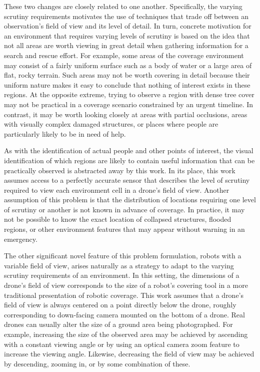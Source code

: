 These two changes are closely related to one another. Specifically, the varying scrutiny requirements motivates the use of techniques that trade off between an observation's field of view and its level of detail. In turn, concrete motivation for an environment that requires varying levels of scrutiny is based on the idea that not all areas are worth viewing in great detail when gathering information for a search and rescue effort. For example, some areas of the coverage environment may consist of a fairly uniform surface such as a body of water or a large area of flat, rocky terrain. Such areas may not be worth covering in detail because their uniform nature makes it easy to conclude that nothing of interest exists in these regions. At the opposite extreme, trying to observe a region with dense tree cover may not be practical in a coverage scenario constrained by an urgent timeline. In contrast, it may be worth looking closely at areas with partial occlusions, areas with visually complex damaged structures, or places where people are particularly likely to be in need of help.

As with the identification of actual people and other points of interest, the visual identification of which regions are likely to contain useful information that can be practically observed is abstracted away by this work. In its place, this work assumes access to a perfectly accurate sensor that describes the level of scrutiny required to view each environment cell in a drone's field of view. Another assumption of this problem is that the distribution of locations requiring one level of scrutiny or another is not known in advance of coverage. In practice, it may not be possible to know the exact location of collapsed structures, flooded regions, or other environment features that may appear without warning in an emergency.

The other significant novel feature of this problem formulation, robots with a variable field of view, arises naturally as a strategy to adapt to the varying scrutiny requirements of an environment. In this setting, the dimensions of a drone's field of view corresponds to the size of a robot's covering tool in a more traditional presentation of robotic coverage. This work assumes that a drone's field of view is always centered on a point directly below the drone, roughly corresponding to down-facing camera mounted on the bottom of a drone. Real drones can usually alter the size of a ground area being photographed. For example, increasing the size of the observed area may be achieved by ascending with a constant viewing angle or by using an optical camera zoom feature to increase the viewing angle. Likewise, decreasing the field of view may be achieved by descending, zooming in, or by some combination of these.

